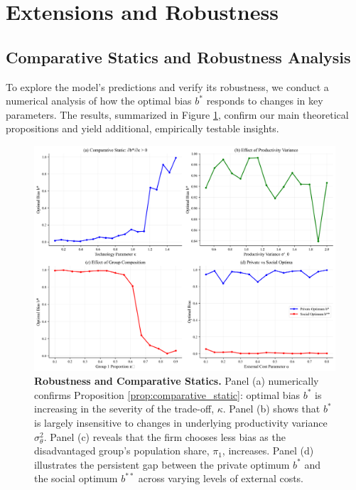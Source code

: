 \section{Extensions and Robustness}

\subsection{Comparative Statics and Robustness Analysis}

To explore the model's predictions and verify its robustness, we conduct a numerical analysis of how the optimal bias $b^*$ responds to changes in key parameters. The results, summarized in Figure \ref{fig:robustness}, confirm our main theoretical propositions and yield additional, empirically testable insights.

\begin{figure}[H]
    \centering
    \includegraphics[width=\textwidth]{../figures/figure_robustness.png}
    \caption[Robustness and Comparative Statics]{\textbf{Robustness and Comparative Statics.} 
    Panel (a) numerically confirms Proposition \ref{prop:comparative_static}: optimal bias $b^*$ is increasing in the severity of the trade-off, $\kappa$.
    Panel (b) shows that $b^*$ is largely insensitive to changes in underlying productivity variance $\sigma^2_\theta$.
    Panel (c) reveals that the firm chooses less bias as the disadvantaged group's population share, $\pi_1$, increases.
    Panel (d) illustrates the persistent gap between the private optimum $b^*$ and the social optimum $b^{**}$ across varying levels of external costs.}
    \label{fig:robustness}
\end{figure}

